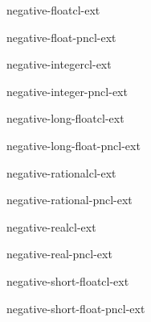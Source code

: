 \begin{type}{negative-float}{}{cl-ext}{}
  
\end{type}

\begin{function}{negative-float-p}{n}{cl-ext}{}
  
\end{function}

\begin{type}{negative-integer}{}{cl-ext}{}
  
\end{type}

\begin{function}{negative-integer-p}{n}{cl-ext}{}
  
\end{function}

\begin{type}{negative-long-float}{}{cl-ext}{}
  
\end{type}

\begin{function}{negative-long-float-p}{n}{cl-ext}{}
  
\end{function}

\begin{type}{negative-rational}{}{cl-ext}{}
  
\end{type}

\begin{function}{negative-rational-p}{n}{cl-ext}{}
  
\end{function}

\begin{type}{negative-real}{}{cl-ext}{}
  
\end{type}

\begin{function}{negative-real-p}{n}{cl-ext}{}
  
\end{function}

\begin{type}{negative-short-float}{}{cl-ext}{}
  
\end{type}

\begin{function}{negative-short-float-p}{n}{cl-ext}{}
  
\end{function}

